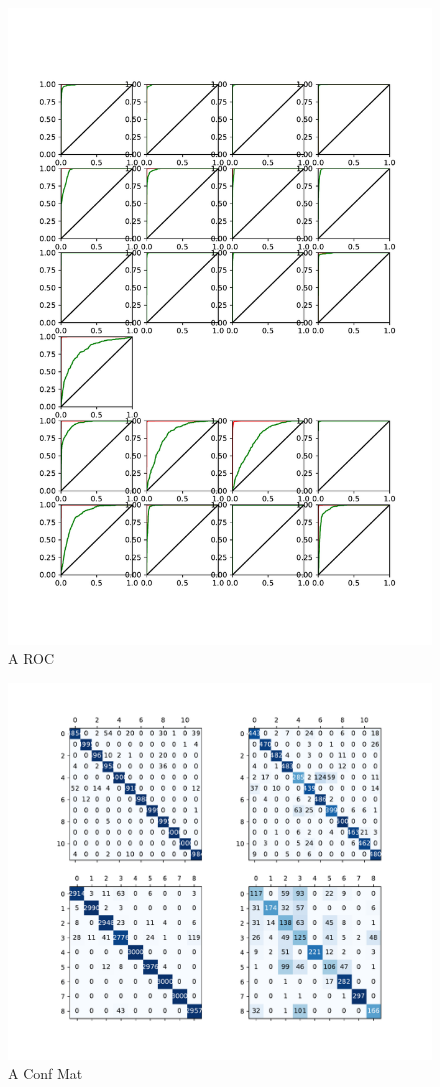 \documentclass{article}
\begin{document}
	\begin{figure}[htbp]
		\centering
		\includegraphics[width=\linewidth]{Figs/abnormity_ROC.pdf}
		\caption{A ROC}
		\vspace{0.3cm}
		\label{fig:A_ROC}
	\end{figure}
	
	\begin{figure}[htbp]
		\centering
		\includegraphics[width=0.8\linewidth]{Figs/abnormity_confusion_matrix.pdf}
		\caption{A Conf Mat}
		\vspace{0.3cm}
		\label{fig:A_conf_mat}
	\end{figure}
	
\end{document}
